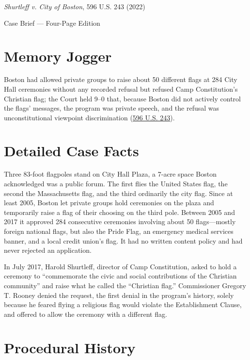\documentclass[12pt]{article}
\begin{document}
\begin{center}
{\LARGE \textit{Shurtleff v. City of Boston}, 596 U.S. 243 (2022)\par}
\vspace{0.8em}
{\large Case Brief --- Four-Page Edition\par}
\end{center}
\vspace{1em}

\section{Memory Jogger}

Boston had allowed private groups to raise about 50 different flags at 284 City Hall ceremonies without any recorded refusal but refused Camp Constitution's Christian flag; the Court held 9--0 that, because Boston did not actively control the flags' messages, the program was private speech, and the refusal was unconstitutional viewpoint discrimination (\href{https://supreme.justia.com/cases/federal/us/596/20-1800/}{596 U.S. 243}).

\section{Detailed Case Facts}

Three 83-foot flagpoles stand on City Hall Plaza, a 7-acre space Boston acknowledged was a public forum. The first flies the United States flag, the second the Massachusetts flag, and the third ordinarily the city flag. Since at least 2005, Boston let private groups hold ceremonies on the plaza and temporarily raise a flag of their choosing on the third pole. Between 2005 and 2017 it approved 284 consecutive ceremonies involving about 50 flags---mostly foreign national flags, but also the Pride Flag, an emergency medical services banner, and a local credit union's flag. It had no written content policy and had never rejected an application.

In July 2017, Harold Shurtleff, director of Camp Constitution, asked to hold a ceremony to ``commemorate the civic and social contributions of the Christian community'' and raise what he called the ``Christian flag.'' Commissioner Gregory T. Rooney denied the request, the first denial in the program's history, solely because he feared flying a religious flag would violate the Establishment Clause, and offered to allow the ceremony with a different flag.

\section{Procedural History}
\end{document}
